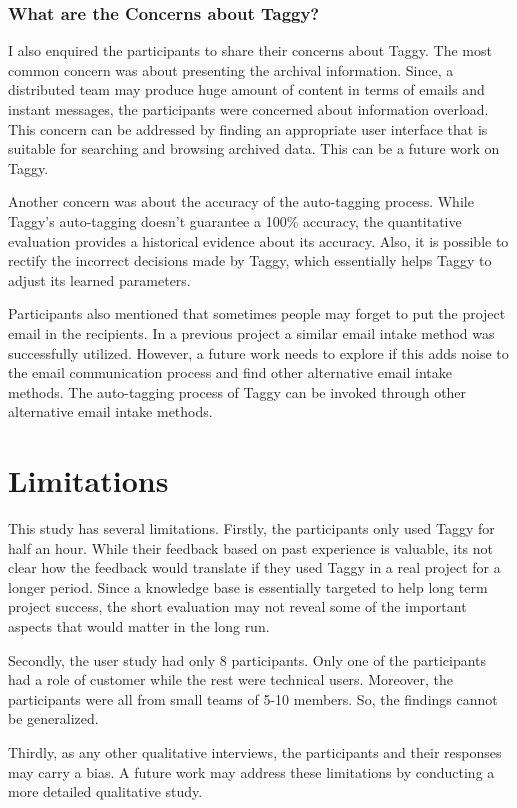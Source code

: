 \subsubsection{What are the Concerns about Taggy?}
I also enquired the participants to share their concerns about Taggy. The most common concern was about presenting the archival information. Since, a distributed team may produce huge amount of content in terms of emails and instant messages, the participants were concerned about information overload. This concern can be addressed by finding an appropriate user interface that is suitable for searching and browsing archived data. This can be a future work on Taggy.

Another concern was about the accuracy of the auto-tagging process. While Taggy's auto-tagging doesn't guarantee a 100\% accuracy, the quantitative evaluation provides a historical evidence about its accuracy. Also, it is possible to rectify the incorrect decisions made by Taggy, which essentially helps Taggy to adjust its learned parameters.

Participants also mentioned that sometimes people may forget to put the project email in the recipients. In a previous project a similar email intake method was successfully utilized\cite{where_did_you}. However, a future work needs to explore if this adds noise to the email communication process and find other alternative email intake methods. The auto-tagging process of Taggy can be invoked through other alternative email intake methods.

\section{Limitations}
This study has several limitations. Firstly, the participants only used Taggy for half an hour. While their feedback based on past experience is valuable, its not clear how the feedback would translate if they used Taggy in a real project for a longer period. Since a knowledge base is essentially targeted to help long term project success, the short evaluation may not reveal some of the important aspects that would matter in the long run.

Secondly, the user study had only 8 participants. Only one of the participants had a role of customer while the rest were technical users. Moreover, the participants were all from small teams of 5-10 members. So, the findings cannot be generalized.

Thirdly, as any other qualitative interviews, the participants and their responses may carry a bias. A future work may address these limitations by conducting a more detailed qualitative study.




